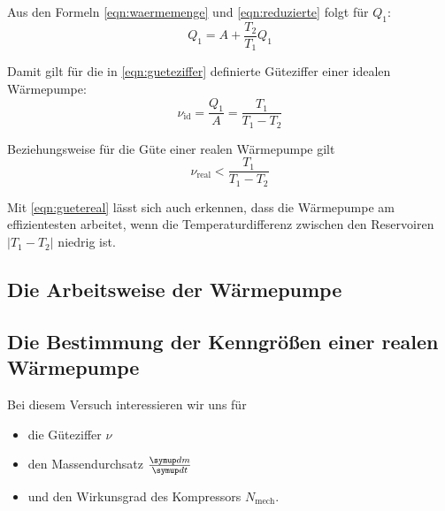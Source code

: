 Aus den Formeln \ref{eqn:waermemenge} und \ref{eqn:reduzierte} folgt für $Q_1$:
\begin{equation}
	Q_1 = A + \frac{T_2}{T_1} Q_1
	\label{eqn:q1}
\end{equation}

Damit gilt für die in \ref{eqn:gueteziffer} definierte Güteziffer einer idealen Wärmepumpe:
\begin{equation}
	\nu_\text{id} = \frac{Q_1}{A} = \frac{T_1}{T_1 - T_2}
	\label{eqn:gueteideal}
\end{equation}

Beziehungsweise für die Güte einer realen Wärmepumpe gilt
\begin{equation}
	\nu_\text{real} <
	\frac{T_1}{T_1 - T_2}
	\label{eqn:guetereal}
\end{equation}

Mit \ref{eqn:guetereal} lässt sich auch erkennen, dass die Wärmepumpe am effizientesten arbeitet,
wenn die Temperaturdifferenz zwischen den Reservoiren $\vert T_1 - T_2 \vert$ niedrig ist.

\subsection{Die Arbeitsweise der Wärmepumpe}

\subsection{Die Bestimmung der Kenngrößen einer realen
Wärmepumpe}

Bei diesem Versuch interessieren wir uns f\"ur
\begin{itemize}
	\item die G\"uteziffer $\nu$
	\item den Massendurchsatz $\frac{\symup d m}{\symup d t}$
	\item und den Wirkunsgrad des Kompressors  $N_\text{mech}$.
\end{itemize}

